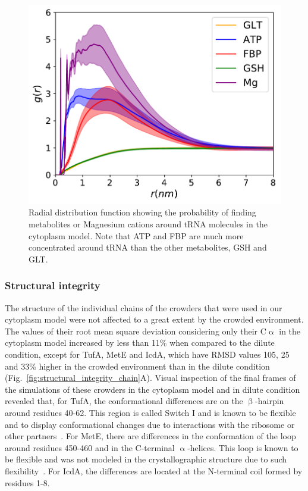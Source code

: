 \documentclass[journal=jcisd8,manuscript=article]{achemso}
\begin{document}
\begin{figure}[H]
\includegraphics[scale=0.5]{rdf_RNA_metabolites.pdf}
\caption{Radial distribution function showing the probability of
  finding metabolites or Magnesium cations around tRNA molecules in
  the cytoplasm model. Note that ATP and FBP are much more
  concentrated around tRNA than the other metabolites, GSH and GLT.}
\label{fig:tRNA_aggregation}
\end{figure}


\subsubsection{Structural integrity}
The structure of the individual chains of the crowders that were used
in our cytoplasm model were not affected to a great extent by the
crowded environment. The values of their root mean square deviation considering only
their C$\upalpha$ in the cytoplasm model increased by less than 11\% when compared to the dilute condition, except for
TufA, MetE and IcdA, which have RMSD values 105, 25 and 33\% higher in
the crowded environment than in the dilute condition (Fig.~\ref{fig:structural_integrity_chain}A). 
Visual inspection of the final frames of the simulations of these crowders in the cytoplasm model and in dilute condition revealed that, for TufA, the conformational differences are on the $\upbeta$-hairpin around residues 40-62. This region is called Switch I and is known to be flexible and to display conformational changes due to interactions with the ribosome or other partners~\cite{Abel1996}. For MetE, there are differences in the conformation of the loop around residues 450-460 and in the C-terminal $\upalpha$-helices. This loop is known to be flexible and was not modeled in the crystallographic structure due to such flexibility~\cite{Ferrer2004}. For IcdA, the differences are located at the N-terminal coil formed by residues 1-8.
\end{document}
